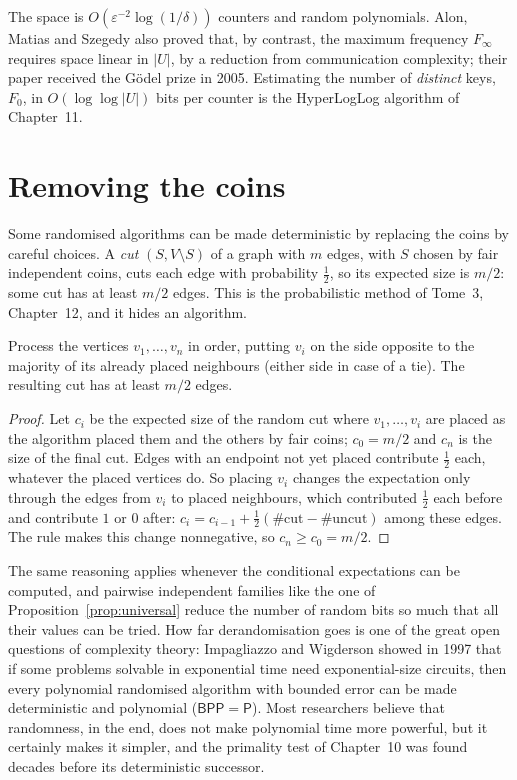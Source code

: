 The space is $O(\varepsilon^{-2}\log(1/\delta))$ counters and random polynomials. Alon, Matias and Szegedy also proved that, by contrast, the maximum frequency $F_\infty$ requires space linear in $|U|$, by a reduction from communication complexity; their paper received the G\"odel prize in 2005. Estimating
the number of \emph{distinct} keys, $F_0$, in $O(\log\log|U|)$ bits per counter is the HyperLogLog algorithm of Chapter~11.

\section{Removing the coins}\label{sec:derandomise}

Some randomised algorithms can be made deterministic by replacing the coins by careful choices. A \emph{cut} $(S,V\setminus S)$ of a graph with $m$ edges, with $S$ chosen by fair independent coins, cuts each edge with probability $\frac12$, so its expected size is $m/2$: some cut has at least $m/2$ edges. This is the
probabilistic method of Tome~3, Chapter~12, and it hides an algorithm.

\begin{proposition}\label{prop:condexp}
Process the vertices $v_1,\dots,v_n$ in order, putting $v_i$ on the side opposite to the majority of its already placed neighbours (either side in case of a tie). The resulting cut has at least $m/2$ edges.
\end{proposition}
\begin{proof}
Let $c_i$ be the expected size of the random cut where $v_1,\dots,v_i$ are placed as the algorithm placed them and the others by fair coins; $c_0=m/2$ and $c_n$ is the size of the final cut. Edges with an endpoint not yet placed contribute $\frac12$ each, whatever the placed vertices do. So placing $v_i$ changes the expectation only through
the edges from $v_i$ to placed neighbours, which contributed $\frac12$ each before and contribute $1$ or $0$ after: $c_i=c_{i-1}+\frac12(\#\text{cut}-\#\text{uncut})$ among these edges. The rule makes this change nonnegative, so $c_n\ge c_0=m/2$.
\end{proof}

The same reasoning applies whenever the conditional expectations can be computed, and pairwise independent families like the one of Proposition~\ref{prop:universal} reduce the number of random bits so much that all their values can be tried. How far derandomisation goes is one of the great open questions of complexity theory: Impagliazzo and Wigderson showed in 1997 that
if some problems solvable in exponential time need exponential-size circuits, then every polynomial randomised algorithm with bounded error can be made deterministic and polynomial ($\mathsf{BPP}=\mathsf P$). Most researchers believe that randomness, in the end, does not make polynomial time more powerful, but it certainly makes it simpler, and
the primality test of Chapter~10 was found decades before its deterministic successor.

